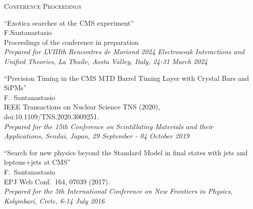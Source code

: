 \documentclass[10pt, a4paper]{article}
\begin{document}
\begin{thebibliography}{599}


\vspace{0.1cm} \begin{center} \textsc{Conference Proceedings} \end{center} \vspace{0.05cm}

``Exotica searches at the CMS experiment''\\
 F.Santanastasio\\
  Proceedings of the conference in preparation \\
{\it Prepared for LVIIIth Rencontres de Moriond 2024 Electroweak Interactions and Unified Theories, La Thuile, Aosta Valley, Italy, 24-31 March 2024}

  ``Precision Timing in the CMS MTD Barrel Timing Layer with Crystal Bars and SiPMs''\\
  F.~Santanastasio\\
  IEEE Transactions on Nuclear Science TNS (2020), doi:10.1109/TNS.2020.3009251.\\
  {\it Prepared for the 15th Conference on Scintillating Materials and their Applications, Sendai, Japan, 29 September - 04 October 2019} 

  ``Search for new physics beyond the Standard Model in final states with jets and leptons+jets at CMS''\\
 F.~Santanastasio\\
  EPJ Web Conf.\ 164, 07039 (2017).\\
  {\it Prepared for the 5th International Conference on New Frontiers in Physics, Kolymbari, Crete, 6-14 July 2016} 


\end{thebibliography}
\end{document}
